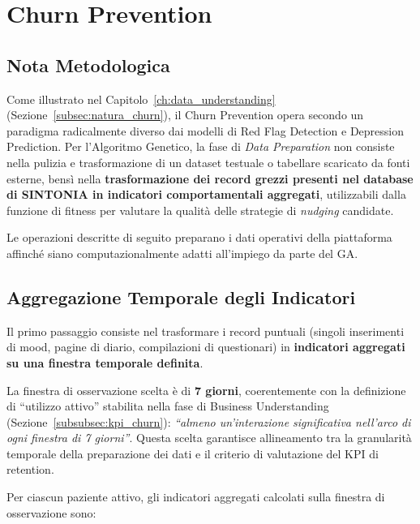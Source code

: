\section{Churn Prevention}
\label{sec:prep_churn}

\subsection{Nota Metodologica}

Come illustrato nel Capitolo~\ref{ch:data_understanding} (Sezione~\ref{subsec:natura_churn}), il Churn Prevention opera secondo un paradigma radicalmente diverso dai modelli di Red Flag Detection e Depression Prediction. Per l'Algoritmo Genetico, la fase di \textit{Data Preparation} non consiste nella pulizia e trasformazione di un dataset testuale o tabellare scaricato da fonti esterne, bensì nella \textbf{trasformazione dei record grezzi presenti nel database di SINTONIA in indicatori comportamentali aggregati}, utilizzabili dalla funzione di fitness per valutare la qualità delle strategie di \textit{nudging} candidate.

Le operazioni descritte di seguito preparano i dati operativi della piattaforma affinché siano computazionalmente adatti all'impiego da parte del GA.

\subsection{Aggregazione Temporale degli Indicatori}
\label{subsec:aggregazione_temporale}

Il primo passaggio consiste nel trasformare i record puntuali (singoli inserimenti di mood, pagine di diario, compilazioni di questionari) in \textbf{indicatori aggregati su una finestra temporale definita}.

La finestra di osservazione scelta è di \textbf{7 giorni}, coerentemente con la definizione di ``utilizzo attivo'' stabilita nella fase di Business Understanding (Sezione~\ref{subsubsec:kpi_churn}): \textit{``almeno un'interazione significativa nell'arco di ogni finestra di 7 giorni''}. Questa scelta garantisce allineamento tra la granularità temporale della preparazione dei dati e il criterio di valutazione del KPI di retention.

Per ciascun paziente attivo, gli indicatori aggregati calcolati sulla finestra di osservazione sono:

